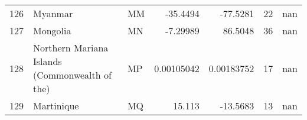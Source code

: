 \begin{tabular}{rllrrrr}
 126 & Myanmar                                        & MM         &  -35.4494      &   -77.5281     &     22 &          nan \\
 127 & Mongolia                                       & MN         &   -7.29989     &    86.5048     &     36 &          nan \\
 128 & Northern Mariana Islands (Commonwealth of the) & MP         &    0.00105042  &     0.00183752 &     17 &          nan \\
 129 & Martinique                                     & MQ         &   15.113       &   -13.5683     &     13 &          nan \\
\hline
\end{tabular}